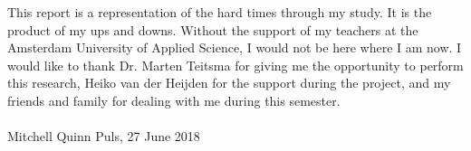 This report is a representation of the hard times through my study. It is the product of my ups and downs. Without the support of my teachers at the Amsterdam University of Applied Science, I would not be here where I am now. I would like to thank Dr. Marten Teitsma for giving me the opportunity to perform this research, Heiko van der Heijden for the support during the project, and my friends and family for dealing with me during this semester.\\~\\
Mitchell Quinn Puls, 27 June 2018